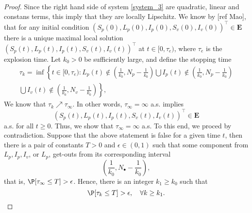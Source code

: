 \begin{proof}
		Since the right hand side of system \eqref{system_3} are quadratic, 
	linear and constans terms, this imply that they are locally Lipschitz. We 
	know by [ref Mao], that for any initial condition
	$
		(S_p(0), L_p(0), I_p(0), S_v (0), I_v(0))^{\top}\in \mathbf{E}
	$ 
	there is a unique maximal local solution 
	$(S_p(t), L_p(t), I_p(t), S_v(t), I_v(t))^{\top}$ 
	at $t\in [0,\tau_e)$, where 
	$\tau_e$ is the explosion time. Let $k_0>0$ be sufficiently large, and 
	define the stopping time
	\begin{multline}
		\label{eqn:invariatn_set}
		\tau_k = %
			\inf
			\left\{
				t \in [0,\tau_e)
				: 
				L_p(t) \notin 
					\left(
						\frac{1}{k_0},
					 N_p - \frac{1}{k_0}
					\right)		
			 \bigcup 
				I_p(t)
				\notin
				\left(
					\frac{1}{k_0}, 
					N_p-\frac{1}{k_0}
				\right)
			\right.
			\\
			\bigcup
			\left.		
					I_v(t) 
					\notin
					\left(
						\frac{1}{k_0},
						N_v - \frac{1}{k_0}
					\right)
			\right\},
		\end{multline}
%	
	We know that $\tau_k \nearrow \tau_\infty$. 
	In other words, $\tau_\infty = \infty$ a.s. 
	implies
	\begin{equation}
		\label{eqn:invariance_prop}
		(
			S_p(t),
			L_p(t),
			I_p(t),
			S_v(t),
			I_v(t)
		)^{\top}\in \mathbf{E}
	\end{equation}
	 a.s. for all $t\geq 0$. Thus, 
	we  show that $\tau_\infty=\infty$ a.s. To this end,  we proced
	by contradiction. Suppose that the above statement is false for a given time $t$, then there is 
	a pair of constants $T>0$ and $\epsilon  \in (0,1)$  such that some component from $L_p,I_p,I_v$, or $L_p$, get-outs from its corresponding 
	interval
	$$
	\left(
		\frac{1}{k_0}, 
	N_{\bullet} - \frac{1}{k_0}
	\right), 
	$$
	that is, %
	$
		\P[\tau_\infty\leq T]>\epsilon 
	$. 
	Hence, there is an integer $k_1\geq k_0$ such that
%	
	\begin{equation}\label{Positive1}
		\P[\tau_k\leq T]>\epsilon,
		\quad \forall k\geq k_1.
	\end{equation}
	

\end{proof}
